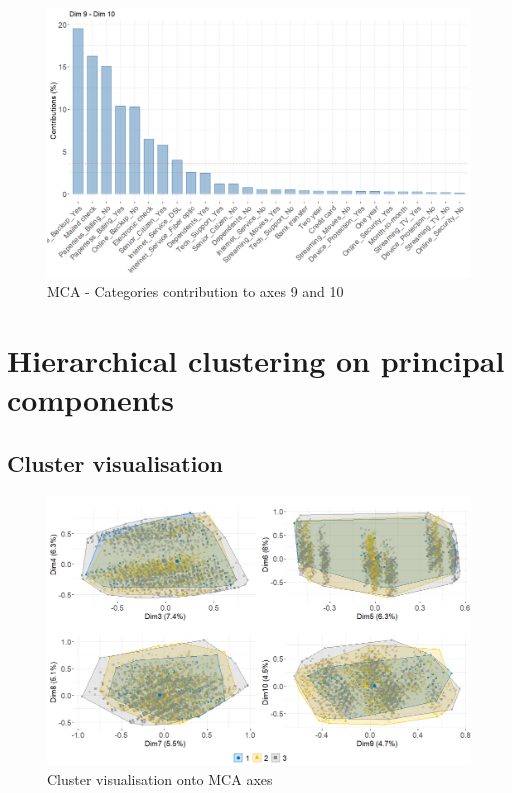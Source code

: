\documentclass[
]{book}
\begin{document}
\begin{figure}

{\centering \includegraphics[width=15.28in]{./imgs/mca_contrib_910} 

}

\caption{MCA -  Categories contribution to axes 9 and 10}\label{fig:mcacontrib910}
\end{figure}

\hypertarget{hierarchical-clustering-on-principal-components-1}{%
\section*{Hierarchical clustering on principal components}\label{hierarchical-clustering-on-principal-components-1}}

\hypertarget{cluster-visualisation-1}{%
\subsection*{Cluster visualisation}\label{cluster-visualisation-1}}

\begin{figure}

{\centering \includegraphics[width=15.28in]{./imgs/cluster_plots} 

}

\caption{Cluster visualisation onto MCA axes}\label{fig:clusterplots}
\end{figure}
\end{document}
